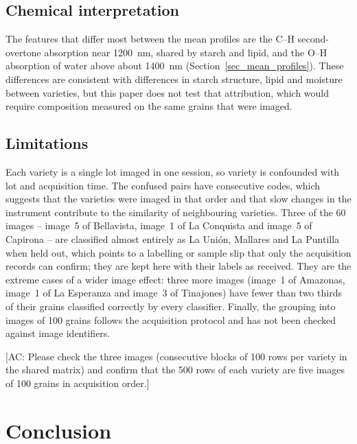 \documentclass[final,5p,times,twocolumn]{elsarticle}
\newcommand{\acnote}[1]{{\color{red}\small\textsf{[AC: #1]}}}
\begin{document}
{\subsection{Chemical interpretation}
The features that differ most between the mean profiles are the C--H second-overtone absorption near 1200~nm, shared by starch and lipid, and the O--H absorption of water above about 1400~nm (Section~\ref{sec_mean_profiles}). These differences are consistent with differences in starch structure, lipid and moisture between varieties, but this paper does not test that attribution, which would require composition measured on the same grains that were imaged.

\subsection{Limitations}\label{sec_limitations}
Each variety is a single lot imaged in one session, so variety is confounded with lot and acquisition time. The confused pairs have consecutive codes, which suggests that the varieties were imaged in that order and that slow changes in the instrument contribute to the similarity of neighbouring varieties. Three of the 60 images -- image~5 of Bellavista, image~1 of La Conquista and image~5 of Capirona -- are classified almost entirely as La Uni\'on, Mallares and La Puntilla when held out, which points to a labelling or sample slip that only the acquisition records can confirm; they are kept here with their labels as received. They are the extreme cases of a wider image effect: three more images (image~1 of Amazonas, image~1 of La Esperanza and image~3 of Tinajones) have fewer than two thirds of their grains classified correctly by every classifier. Finally, the grouping into images of 100 grains follows the acquisition protocol and has not been checked against image identifiers.}
\acnote{Please check the three images (consecutive blocks of 100 rows per variety in the shared matrix) and confirm that the 500 rows of each variety are five images of 100 grains in acquisition order.}

\section{Conclusion}
\end{document}
